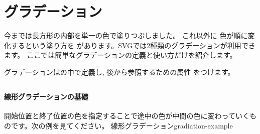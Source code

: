 \section{グラデーション}
今までは長方形の内部を単一の色で塗りつぶしました。
これ以外に
色が順に変化するという塗り方を
があります。SVGでは2種類のグラデーションが利用できます。
ここでは簡単なグラデーションの定義と使い方だけを紹介します。

グラデーションはの中で定義し, 後から参照するための属性
をつけます。
\subsection{}
\paragraph{線形グラデーションの基礎}
開始位置と終了位置の色を指定することで途中の色が中間の色に変わっていくも
のです。次の例を見てください。
{}
    {線形グラデーション}{gradiation-example}
